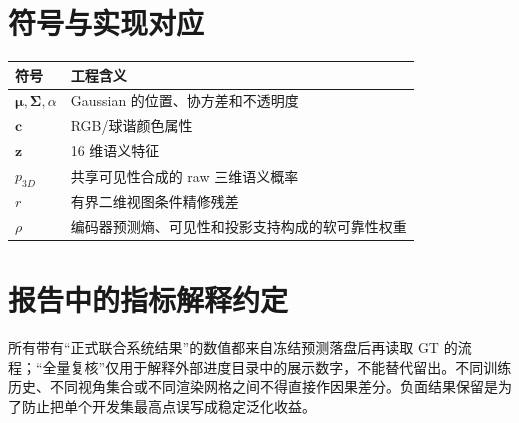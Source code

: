 \documentclass[UTF8,a4paper,11pt]{ctexart}
\begin{document}
\section{符号与实现对应}
\begin{table}[h]
\centering
\begin{tabular}{ll}
\toprule
符号 & 工程含义\\
\midrule
$\boldsymbol\mu,\boldsymbol{\Sigma},\alpha$ & Gaussian 的位置、协方差和不透明度\\
$\mathbf c$ & RGB/球谐颜色属性\\
$\mathbf z$ & 16 维语义特征\\
$p_{3D}$ & 共享可见性合成的 raw 三维语义概率\\
$r$ & 有界二维视图条件精修残差\\
$\rho$ & 编码器预测熵、可见性和投影支持构成的软可靠性权重\\
\bottomrule
\end{tabular}
\end{table}

\section{报告中的指标解释约定}
所有带有“正式联合系统结果”的数值都来自冻结预测落盘后再读取 GT 的流程；“全量复核”仅用于解释外部进度目录中的展示数字，不能替代留出。不同训练历史、不同视角集合或不同渲染网格之间不得直接作因果差分。负面结果保留是为了防止把单个开发集最高点误写成稳定泛化收益。
\end{document}
